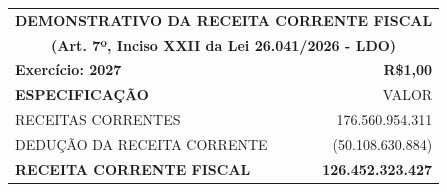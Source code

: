 \documentclass{article}
\begin{document}

\pagestyle{empty}

\renewcommand*{\arraystretch}{1.9}\footnotesize\color{myblack}\centering\noindent\begin{longtable}[c]{m{15cm}m{5cm}}\multicolumn{2}{c}{\cellcolor{gray!50} \textcolor{myblack} {\small \textbf{DEMONSTRATIVO DA RECEITA CORRENTE FISCAL}}} \\\multicolumn{2}{c}{\cellcolor{gray!50} \textcolor{myblack} {\footnotesize \textbf{(Art. 7º, Inciso XXII da Lei 26.041/2026 - LDO)}}}  \\\multicolumn{1}{l}{\textbf{Exercício:  2027 }} & \multicolumn{1}{r}{\textbf{R\$1,00}} \\\hline\hline\multicolumn{1}{l}{\textbf{ ESPECIFICAÇÃO}} & \multicolumn{1}{r}{VALOR} \\\hline\hline\multicolumn{1}{L{15cm}}{ RECEITAS CORRENTES } & \multicolumn{1}{r}{ 176.560.954.311 } \\
\multicolumn{1}{L{15cm}}{ DEDUÇÃO DA RECEITA CORRENTE } & \multicolumn{1}{r}{ (50.108.630.884) } \\
\hline\hline\hline
\multicolumn{1}{L{15cm}}{ \textbf{ RECEITA CORRENTE FISCAL }} & \multicolumn{1}{r}{ \textbf{ 126.452.323.427 }} \\
\hline\hline\hline\end{longtable}\raggedright\fontsize{7pt}{10pt}\selectfont {Fonte: PPO.}\\\fontsize{7pt}{10pt}\selectfont {ELABORAÇÃO: DCAF/SCPPO/SEPLAG}\\
\end{document}
